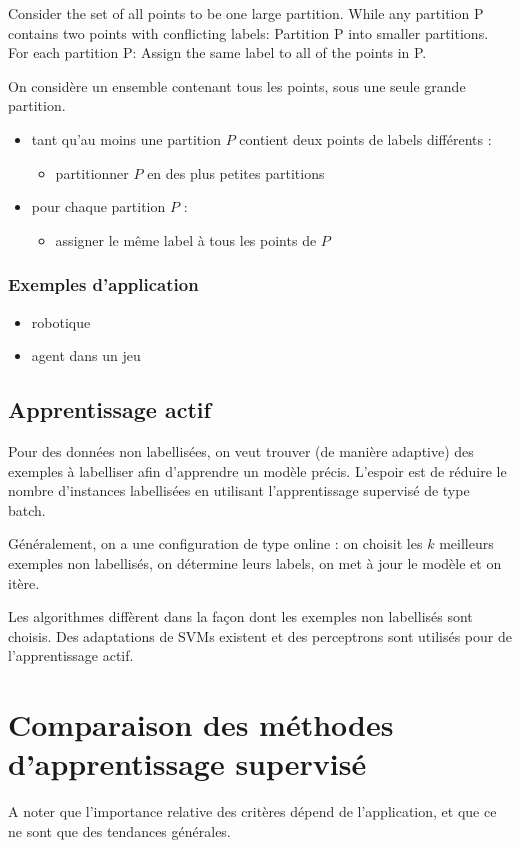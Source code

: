			Consider the set of all points to be one large partition.
While any partition P contains two points with conflicting labels:
  Partition P into smaller partitions.
For each partition P:
  Assign the same label to all of the points in P.
  
  			On considère un ensemble contenant tous les points, sous une seule grande partition.
  			
  			\begin{itemize}
  				\item tant qu'au moins une partition $P$ contient deux points de labels différents :
  				\begin{itemize}
  					\item partitionner $P$ en des plus petites partitions
  				\end{itemize}
  				
  				\item pour chaque partition $P$ :
  				\begin{itemize}
  					\item assigner le même label à tous les points de $P$
  				\end{itemize}
  			\end{itemize}
			
			\subsubsection{Exemples d'application}
			
			\begin{itemize}
				\item robotique
				\item agent dans un jeu
			\end{itemize}
		
		\subsection{Apprentissage actif}
		
		Pour des données non labellisées, on veut trouver (de manière adaptive) des exemples à labelliser afin d'apprendre un modèle précis. L'espoir est de réduire le nombre d'instances labellisées en utilisant l'apprentissage supervisé de type batch.
		
		Généralement, on a une configuration de type online : on choisit les $k$ meilleurs exemples non labellisés, on détermine leurs labels, on met à jour le modèle et on itère.
		
		Les algorithmes diffèrent dans la façon dont les exemples non labellisés sont choisis. Des adaptations de SVMs existent et des perceptrons sont utilisés pour de l'apprentissage actif.
		
\section{Comparaison des méthodes d'apprentissage supervisé}
	

A noter que l'importance relative des critères dépend de l'application, et que ce ne sont que des tendances générales.
